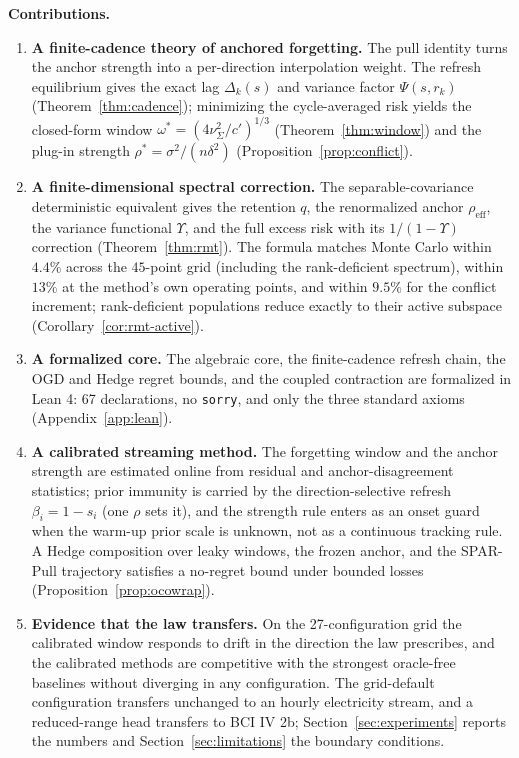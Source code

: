 \documentclass[10pt]{article}
\begin{document}
\textbf{Contributions.}
\begin{enumerate}
\item \textbf{A finite-cadence theory of anchored forgetting.}
The pull identity turns the anchor strength into a per-direction interpolation weight.
The refresh equilibrium gives the exact lag $\Delta_k(s)$ and variance factor $\Psi(s,r_k)$ (Theorem~\ref{thm:cadence}); minimizing the cycle-averaged risk yields the closed-form window $\omega^*=(4\nu^2_\Sigma/c')^{1/3}$ (Theorem~\ref{thm:window}) and the plug-in strength $\rho^*=\sigma^2/(n\delta^2)$ (Proposition~\ref{prop:conflict}).

\item \textbf{A finite-dimensional spectral correction.}
The separable-covariance deterministic equivalent gives the retention $q$, the renormalized anchor $\rho_{\mathrm{eff}}$, the variance functional $\Upsilon$, and the full excess risk with its $1/(1-\Upsilon)$ correction (Theorem~\ref{thm:rmt}).
The formula matches Monte Carlo within $4.4\%$ across the $45$-point grid (including the rank-deficient spectrum), within $13\%$ at the method's own operating points, and within $9.5\%$ for the conflict increment; rank-deficient populations reduce exactly to their active subspace (Corollary~\ref{cor:rmt-active}).

\item \textbf{A formalized core.}
The algebraic core, the finite-cadence refresh chain, the OGD and Hedge regret bounds, and the coupled contraction are formalized in Lean 4: 67 declarations, no \texttt{sorry}, and only the three standard axioms (Appendix~\ref{app:lean}).

\item \textbf{A calibrated streaming method.}
The forgetting window and the anchor strength are estimated online from residual and anchor-disagreement statistics; prior immunity is carried by the direction-selective refresh $\beta_i = 1 - s_i$ (one $\rho$ sets it), and the strength rule enters as an onset guard when the warm-up prior scale is unknown, not as a continuous tracking rule.
A Hedge composition over leaky windows, the frozen anchor, and the SPAR-Pull trajectory satisfies a no-regret bound under bounded losses (Proposition~\ref{prop:ocowrap}).

\item \textbf{Evidence that the law transfers.}
On the 27-configuration grid the calibrated window responds to drift in the direction the law prescribes, and the calibrated methods are competitive with the strongest oracle-free baselines without diverging in any configuration.
The grid-default configuration transfers unchanged to an hourly electricity stream, and a reduced-range head transfers to BCI IV 2b; Section~\ref{sec:experiments} reports the numbers and Section~\ref{sec:limitations} the boundary conditions.
\end{enumerate}
\end{document}

